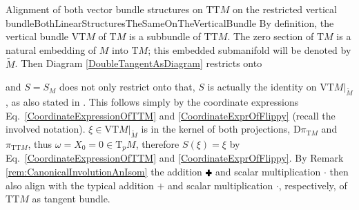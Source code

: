 \documentclass[a4paper,oneside,11pt,bibliography=totoc]{scrartcl}
\def\RPlus{\ensuremath{\mathbin{\rule[.13em]{.66em}{.22em}\hspace{-.44em}\rule[-.08em]{.22em}{.66em}\,}}} %
\theoremstyle{plain}
\theoremstyle{remark}
\theoremstyle{definition}
\begin{document}
\begin{remarks}{Alignment of both vector bundle structures on $\mathrm{TT}M$ on the restricted vertical bundle}{BothLinearStructuresTheSameOnTheVerticalBundle}
By definition, the vertical bundle $\mathrm{VT}M$ of $\mathrm{T}M$ is a subbundle of $\mathrm{TT}M$. The zero section of $\mathrm{T}M$ is a natural embedding of $M$ into $\mathrm{T}M$; this embedded submanifold will be denoted by $\widetilde{M}$. Then Diagram \eqref{DoubleTangentAsDiagram} restricts onto
\begin{center}
\end{center} 
and $S=S_M$ does not only restrict onto that, $S$ is actually the identity on $\mathrm{VT}M|_{\widetilde{M}}$, as also stated in \cite[\S 9.6, Thm.\ 9.6.1, page 363; but without proof]{mackenzieGeneralTheory}. This follows simply by the coordinate expressions Eq.\ \eqref{CoordinateExpressionOfTTM} and \eqref{CoordinateExprOfFlippy} (recall the involved notation). $\xi \in \mathrm{VT}M|_{\widetilde{M}}$ is in the kernel of both projections, $\mathrm{D}\pi_{\mathrm{T}M}$ and $\pi_{\mathrm{TT}M}$, thus $\omega = X_0 = 0 \in \mathrm{T}_pM$, therefore $S(\xi) = \xi$ by Eq.\ \eqref{CoordinateExpressionOfTTM} and \eqref{CoordinateExprOfFlippy}. By Remark \ref{rem:CanonicalInvolutionAnIsom} the addition $\RPlus$ and scalar multiplication $\boldsymbol{\cdot}$ then also align with the typical addition $+$ and scalar multiplication $\cdot$, respectively, of $\mathrm{TT}M$ as tangent bundle.


\end{remarks}
\end{document}
